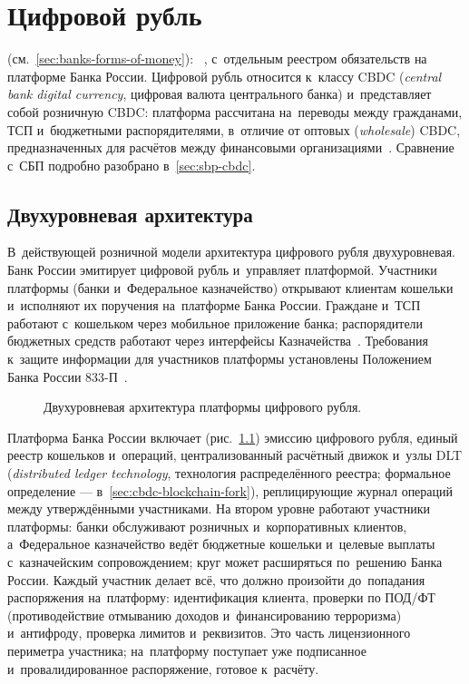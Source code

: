 
\chapter{Цифровой рубль}\label{ch:cbdc}
(см.\ \autoref{sec:banks-forms-of-money}): ~\cite{fz-340,cbr-digital-ruble}, с~отдельным реестром
обязательств на платформе Банка России. Цифровой рубль относится
к~классу CBDC (\textit{central bank digital currency}, цифровая валюта
центрального банка) и~представляет собой розничную CBDC: платформа
рассчитана на~переводы между гражданами, ТСП и~бюджетными
распорядителями, в~отличие от оптовых (\textit{wholesale}) CBDC,
предназначенных для расчётов между финансовыми
организациями~\cite{bis-wp880-cbdc-architectures}.
Сравнение с~СБП подробно разобрано в~\autoref{sec:sbp-cbdc}.

\section{Двухуровневая архитектура}\label{sec:cbdc-architecture}

В~действующей розничной модели архитектура цифрового рубля
двухуровневая. Банк России эмитирует цифровой рубль и~управляет
платформой. Участники платформы (банки и~Федеральное
казначейство) открывают клиентам кошельки и~исполняют их
поручения на~платформе Банка России. Граждане и~ТСП работают
с~кошельком через мобильное приложение банка; распорядители
бюджетных средств работают через интерфейсы
Казначейства~\cite{cbr-digital-ruble}.
Требования к~защите информации для участников платформы установлены
Положением Банка России 833-П~\cite{cbr-833p}.

\begin{figure}[tbp]
  \centering
  \caption{Двухуровневая архитектура платформы цифрового
  рубля.}\label{fig:cbdc-two-tier}
\end{figure}

Платформа Банка России включает (рис.~\ref{fig:cbdc-two-tier})
эмиссию цифрового рубля, единый реестр кошельков и~операций,
централизованный расчётный движок и~узлы DLT (\textit{distributed
ledger technology}, технология распределённого реестра; формальное
определение --- в~\autoref{sec:cbdc-blockchain-fork}), реплицирующие
журнал операций между утверждёнными участниками. На втором уровне работают
участники платформы: банки обслуживают розничных и~корпоративных
клиентов, а~Федеральное казначейство ведёт бюджетные кошельки
и~целевые выплаты с~казначейским сопровождением; круг может
расширяться по~решению Банка России. Каждый участник делает всё, что должно произойти
до~попадания распоряжения на~платформу: идентификация клиента,
проверки по ПОД/ФТ (противодействие отмыванию доходов
и~финансированию терроризма) и~антифроду, проверка лимитов и~реквизитов. Это часть
лицензионного периметра участника; на~платформу поступает уже
подписанное и~провалидированное распоряжение, готовое к~расчёту.

